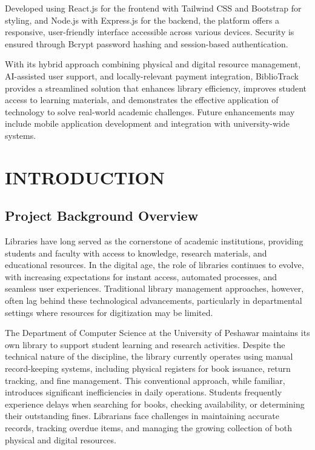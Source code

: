 \documentclass[12pt,a4paper]{report}
\begin{document}
\vspace{0.4cm}
Developed using React.js for the frontend with Tailwind CSS and Bootstrap for styling, and Node.js with Express.js for the backend, the platform offers a responsive, user-friendly interface accessible across various devices. Security is ensured through Bcrypt password hashing and session-based authentication.

With its hybrid approach combining physical and digital resource management, AI-assisted user support, and locally-relevant payment integration, BiblioTrack provides a streamlined solution that enhances library efficiency, improves student access to learning materials, and demonstrates the effective application of technology to solve real-world academic challenges. Future enhancements may include mobile application development and integration with university-wide systems.

\newpage
\renewcommand{\contentsname}{Table of Contents} %
\tableofcontents



\newpage
{}
\chapter{INTRODUCTION}

\section{Project Background Overview}
\label{sec:background}
Libraries have long served as the cornerstone of academic institutions, providing students and faculty with access to knowledge, research materials, and educational resources. In the digital age, the role of libraries continues to evolve, with increasing expectations for instant access, automated processes, and seamless user experiences. Traditional library management approaches, however, often lag behind these technological advancements, particularly in departmental settings where resources for digitization may be limited.

The Department of Computer Science at the University of Peshawar maintains its own library to support student learning and research activities. Despite the technical nature of the discipline, the library currently operates using manual record-keeping systems, including physical registers for book issuance, return tracking, and fine management. This conventional approach, while familiar, introduces significant inefficiencies in daily operations. Students frequently experience delays when searching for books, checking availability, or determining their outstanding fines. Librarians face challenges in maintaining accurate records, tracking overdue items, and managing the growing collection of both physical and digital resources.
\end{document}
